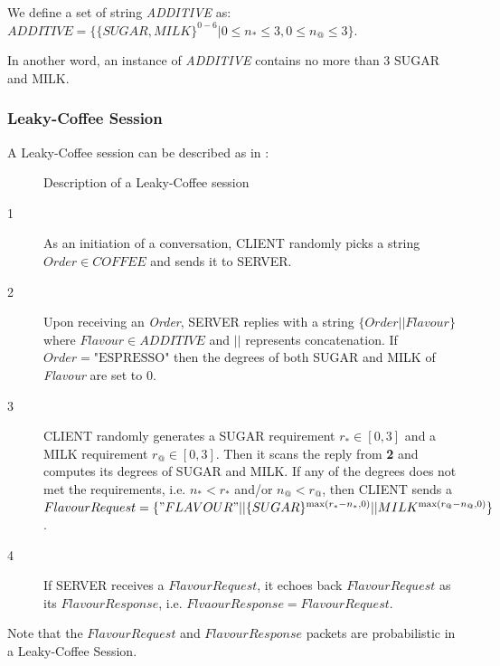 \begin{definition}
We define a set of string \textit{ADDITIVE} as:\\
$ADDITIVE = \{\{ SUGAR, MILK \}^{0 - 6} | 0 \leq n_{*} \leq 3, 0 \leq n_{@} \leq 3 \}$.

In another word, an instance of \textit{ADDITIVE} contains no more than 3 SUGAR and MILK.
\end{definition}

\subsubsection{Leaky-Coffee Session}
A Leaky-Coffee session can be described as in :

\begin{figure}[H]
\centering
\resizebox{10cm}{!}
{}
\caption{Description of a Leaky-Coffee session}
\label{Fig: Leaky-Coffee Session}
\end{figure}

\begin{description}
\item[1] As an initiation of a conversation, CLIENT randomly picks a string $Order \in COFFEE$ and sends it to SERVER.

\item[2] Upon receiving an \textit{Order}, SERVER replies with a string $\{Order || Flavour\}$ where $Flavour \in ADDITIVE$ and $||$ represents concatenation. If $Order = \text{"ESPRESSO"}$ then the degrees of both SUGAR and MILK of \textit{Flavour} are set to $0$\label{ESPRESSO}.

\item[3] CLIENT randomly generates a SUGAR requirement $r_* \in [0, 3]$ and a MILK requirement $r_@ \in [0,3]$. Then it scans the reply from \textbf{2} and computes its degrees of SUGAR and MILK. If any of the degrees does not  met the requirements, i.e. $n_* < r_*$ and/or $n_@ < r_@$, then CLIENT sends a $ FlavourRequest = \{"FLAVOUR"||\{SUGAR\}^{\max({r_* - n_*,0})} || MILK^{\max(r_@ -  n_@, 0)} \} $.

\item[4] If SERVER receives a $FlavourRequest$, it echoes back $FlavourRequest$ as its $FlavourResponse$, i.e. $FlvaourResponse = FlavourRequest$.	
\end{description}

Note that the $FlavourRequest$ and $FlavourResponse$ packets are probabilistic in a Leaky-Coffee Session.

